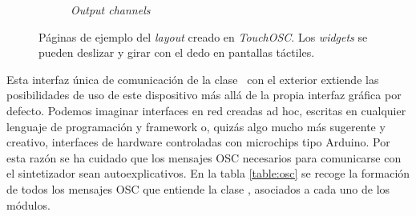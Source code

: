 \begin{figure}
\begin{subfigure}[b]{0.3\textwidth}
		\caption{\textit{Output channels}}
		\label{fig:touchOSC_channels}
	\end{subfigure}
	\caption{Páginas de ejemplo del \textit{layout} creado en \textit{TouchOSC}. Los \textit{widgets} se pueden deslizar y girar con el dedo en pantallas táctiles.}
	\label{fig:touchOSC}
\end{figure}

Esta interfaz única de comunicación de la clase \className\ con el exterior extiende las posibilidades de uso de este dispositivo más allá de la propia interfaz gráfica por defecto. Podemos imaginar interfaces en red creadas ad hoc, escritas en cualquier lenguaje de programación y framework o, quizás algo mucho más sugerente y creativo, interfaces de hardware controladas con microchips tipo Arduino. Por esta razón se ha cuidado que los mensajes OSC necesarios para comunicarse con el sintetizador sean autoexplicativos. En la tabla \ref{table:osc} se recoge la formación de todos los mensajes OSC que entiende la clase \texttt{\className}, asociados a cada uno de los módulos.

